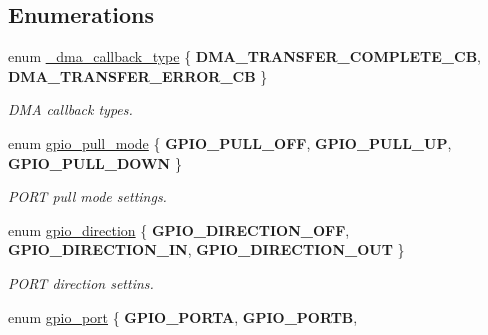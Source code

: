 \subsection*{Enumerations}
\begin{DoxyCompactItemize}
\item 
\mbox{\label{group___h_p_l_gaf65002742527ebb1bf4157229990d465}} 
enum \hyperlink{group___h_p_l_gaf65002742527ebb1bf4157229990d465}{\+\_\+dma\+\_\+callback\+\_\+type} \{ {\bfseries D\+M\+A\+\_\+\+T\+R\+A\+N\+S\+F\+E\+R\+\_\+\+C\+O\+M\+P\+L\+E\+T\+E\+\_\+\+CB}, 
{\bfseries D\+M\+A\+\_\+\+T\+R\+A\+N\+S\+F\+E\+R\+\_\+\+E\+R\+R\+O\+R\+\_\+\+CB}
 \}\begin{DoxyCompactList}\small\item\em D\+MA callback types. \end{DoxyCompactList}
\item 
\mbox{\label{group___h_p_l_gab9959d4bcdc5049e5898d5100ada3197}} 
enum \hyperlink{group___h_p_l_gab9959d4bcdc5049e5898d5100ada3197}{gpio\+\_\+pull\+\_\+mode} \{ {\bfseries G\+P\+I\+O\+\_\+\+P\+U\+L\+L\+\_\+\+O\+FF}, 
{\bfseries G\+P\+I\+O\+\_\+\+P\+U\+L\+L\+\_\+\+UP}, 
{\bfseries G\+P\+I\+O\+\_\+\+P\+U\+L\+L\+\_\+\+D\+O\+WN}
 \}\begin{DoxyCompactList}\small\item\em P\+O\+RT pull mode settings. \end{DoxyCompactList}
\item 
\mbox{\label{group___h_p_l_gaccc7d029df9e5a96151a68e64f4be7e2}} 
enum \hyperlink{group___h_p_l_gaccc7d029df9e5a96151a68e64f4be7e2}{gpio\+\_\+direction} \{ {\bfseries G\+P\+I\+O\+\_\+\+D\+I\+R\+E\+C\+T\+I\+O\+N\+\_\+\+O\+FF}, 
{\bfseries G\+P\+I\+O\+\_\+\+D\+I\+R\+E\+C\+T\+I\+O\+N\+\_\+\+IN}, 
{\bfseries G\+P\+I\+O\+\_\+\+D\+I\+R\+E\+C\+T\+I\+O\+N\+\_\+\+O\+UT}
 \}\begin{DoxyCompactList}\small\item\em P\+O\+RT direction settins. \end{DoxyCompactList}
\item 
\mbox{\label{group___h_p_l_ga6d50d8c4b17ff573c07340d4d7965bc1}} 
enum \hyperlink{group___h_p_l_ga6d50d8c4b17ff573c07340d4d7965bc1}{gpio\+\_\+port} \{ \newline
{\bfseries G\+P\+I\+O\+\_\+\+P\+O\+R\+TA}, 
{\bfseries G\+P\+I\+O\+\_\+\+P\+O\+R\+TB}, 

\end{DoxyCompactItemize}
